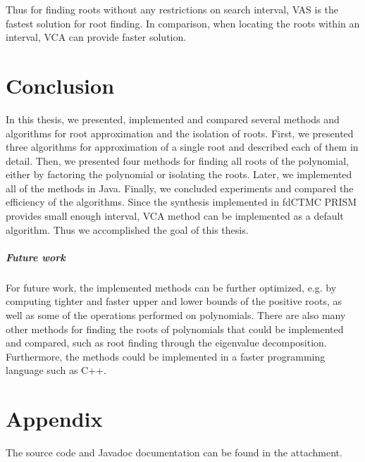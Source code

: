 \documentclass[
  digital, %
  notable,   %
  nolof,     %
  nolot,     %
	final, %
]{fithesis3}
\begin{document}
Thus for finding roots without any restrictions on search interval, VAS is the fastest solution for root finding. In comparison, when locating the roots within an interval, VCA can provide faster solution.

\chapter{Conclusion}
In this thesis, we presented, implemented and compared several methods and algorithms for root approximation and the isolation of roots. First, we presented three algorithms for approximation of a single root and described each of them in detail. Then, we presented four methods for finding all roots of the polynomial, either by factoring the polynomial or isolating the roots. Later, we implemented all of the methods in Java. Finally, we concluded experiments and compared the efficiency of the algorithms. Since the synthesis implemented in fdCTMC PRISM provides small enough interval, VCA method can be implemented as a default algorithm. Thus we accomplished the goal of this thesis.

\paragraph{Future work}
For future work, the implemented methods can be further optimized, e.g. by computing tighter and faster upper and lower bounds of the positive roots, as well as some of the operations performed on polynomials. There are also many other methods for finding the roots of polynomials that could be implemented and compared, such as root finding through the eigenvalue decomposition. Furthermore, the methods could be implemented in a faster programming language such as C++. 

\printbibliography[heading=bibintoc]


  \makeatletter\thesis@blocks@clear\makeatother

\chapter{Appendix}
The source code and Javadoc documentation can be found in the attachment.
\end{document}
